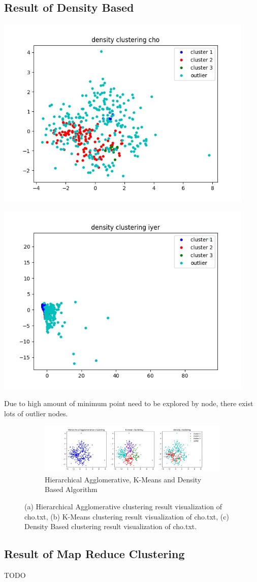 \documentclass[fleqn]{llncs}
\begin{document}
\subsection{Result of Density Based}

\includegraphics[width=350pt]{densitycho.jpg}

\includegraphics[width=350pt]{densityiyer.jpg}

Due to high amount of minimum point need to be explored by node, there exist lots of outlier nodes.

\begin{figure}
	\centering
	\begin{subfigure}{1\textwidth}
		\centering\includegraphics[width=1\textwidth]{all_three.jpg}
		\caption{Hierarchical Agglomerative, K-Means and Density Based Algorithm}
	\end{subfigure}
	\caption{(a) Hierarchical Agglomerative clustering result visualization of cho.txt, (b) K-Means clustering result visualization of cho.txt, (c) Density Based clustering result visualization of cho.txt.}
	\label{fig2}
\end{figure}
\subsection{Result of Map Reduce Clustering}

TODO
\end{document}
